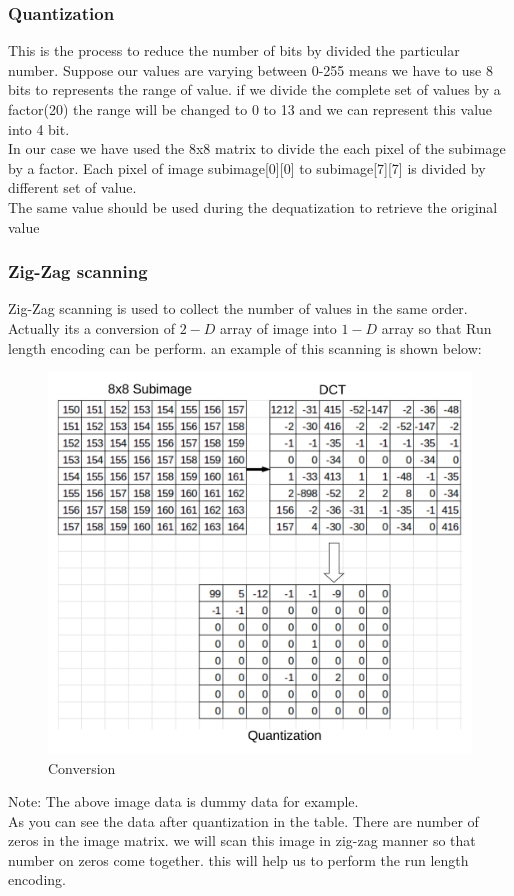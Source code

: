 \documentclass[a4paper]{article}
\begin{document}
\subsubsection{Quantization}
This is the process to reduce the number of bits by divided the particular number. Suppose our values are varying between 0-255 means we have to use 8 bits to represents the range of value. if we divide the complete set of values by a factor(20) the range will be changed to 0 to 13 and we can represent this value into 4 bit. \\

In our case we have used the 8x8 matrix to divide the each pixel of the subimage by a factor. Each pixel of image subimage[0][0] to subimage[7][7] is divided by different set of value.\\
The same value should be used during the dequatization to retrieve the original value
\newpage

\subsubsection{Zig-Zag scanning}
Zig-Zag scanning is used to collect the number of values in the same order. Actually its a conversion of $2-D$ array of image into $1-D$ array so that Run length encoding can be perform. an example of this scanning is shown below:

\begin{figure}[H]
    \centering
    \includegraphics[width = \linewidth]{table.png}
    \caption{Conversion}
    \label{fig:my_label}
\end{figure}
Note: The above image data is dummy data for example.\\
As you can see the data after quantization in the table. There are number of zeros in the image matrix. we will scan this image in zig-zag manner so that number on zeros come together. this will help us to perform the run length encoding.
\end{document}
